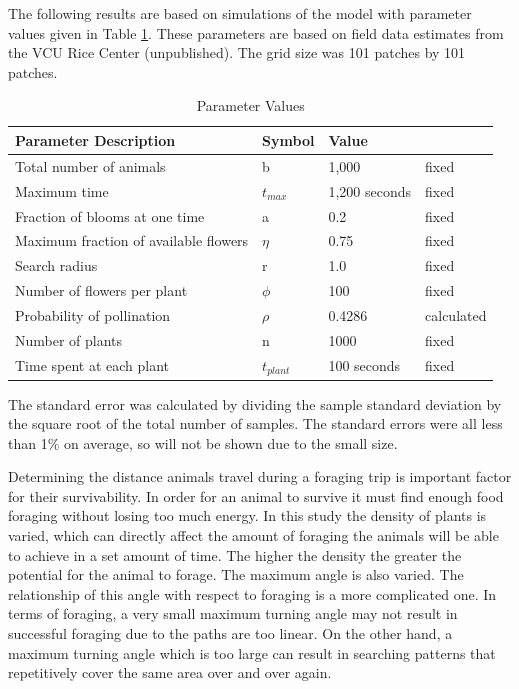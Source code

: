The following results are based on simulations of the model with parameter values given in Table
\ref{parameter}.  These parameters are based on field data estimates from the VCU Rice Center
(unpublished).  The grid size was 101 patches by 101 patches.
\begin{table}
  \begin{tabular}{|l|l|l|l|}
    \hline
    Parameter Description & Symbol & Value &  \\ \hline  \label{parameter}
    Total number of animals & b & 1,000 & fixed  \\ \hline
    Maximum time & $t_{max}$ & 1,200 seconds & fixed \\ \hline
    Fraction of blooms at one time & a & 0.2 & fixed \\ \hline
    Maximum fraction of available flowers & $\eta$ & 0.75 & fixed \\ \hline
    Search radius & r & 1.0 & fixed \\ \hline
    Number of flowers per plant & $\phi$ & 100 & fixed \\ \hline
    Probability of pollination   & $\rho$ & 0.4286 & calculated \\ \hline
    Number of plants & n & 1000 & fixed \\ \hline
    Time spent at each plant & $t_{plant}$ & 100 seconds & fixed \\ \hline
  \end{tabular}
  \caption{Parameter Values}
\end{table}

The standard error was calculated by dividing the sample standard deviation by the square root of
the total number of samples.   The standard errors were all less than 1\% on average, so will not be
shown due to the small size.

Determining the distance animals travel during a foraging trip is important factor for their
survivability.  In order for an animal to survive it must find enough food foraging without losing
too much energy.  In this study the density of plants is varied, which can directly affect the
amount of foraging the animals will be able to achieve in a set amount of time.  The higher the
density the greater the potential for the animal to forage.  The maximum angle is also varied.  The
relationship of this angle with respect to foraging is a more complicated one.  In terms of
foraging, a very small maximum turning angle may not result in successful foraging due to the paths
are too linear.  On the other hand, a maximum turning angle which is too large can result in
searching patterns that repetitively cover the same area over and over again.

